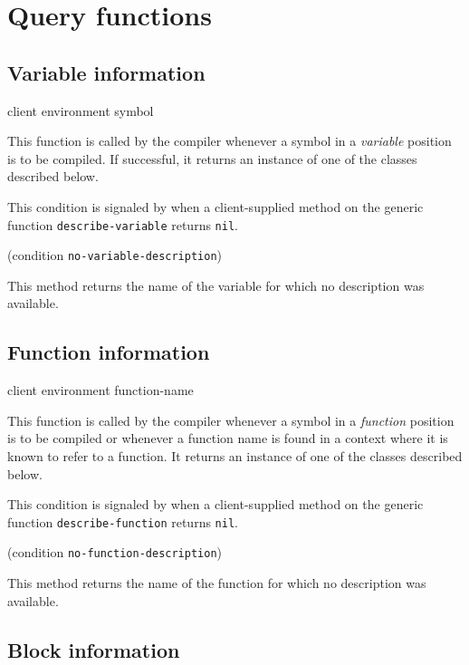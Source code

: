 \section{Query functions}

\subsection{Variable information}

 {client environment symbol}

This function is called by the compiler whenever a symbol in a
\emph{variable} position is to be compiled.  If successful, it returns
an instance of one of the classes described below.


This condition is signaled by \sysname{} when a client-supplied method
on the generic function \texttt{describe-variable} returns \texttt{nil}.

 {(condition {\tt no-variable-description})}

This method returns the name of the variable for which no description was
available.

\subsection{Function information}

 {client environment function-name}

This function is called by the compiler whenever a symbol in a
\emph{function} position is to be compiled or whenever a function name
is found in a context where it is known to refer to a function.  It
returns an instance of one of the classes described below.


This condition is signaled by \sysname{} when a client-supplied method
on the generic function \texttt{describe-function} returns \texttt{nil}.

 {(condition {\tt no-function-description})}

This method returns the name of the function for which no description was
available.

\subsection{Block information}


